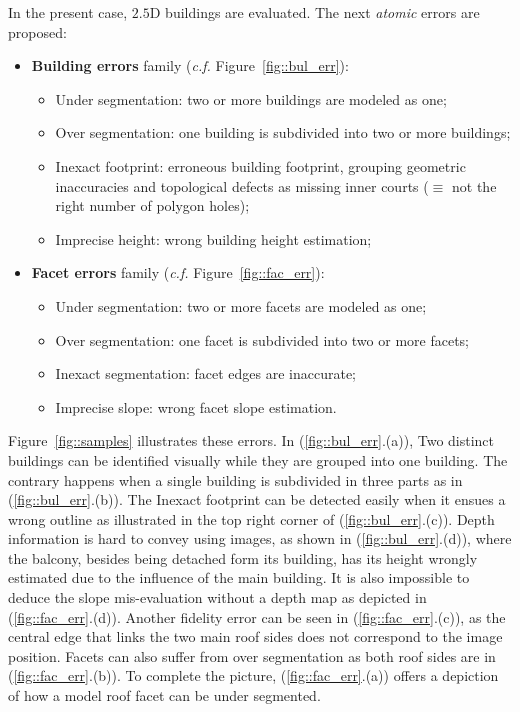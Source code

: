 \documentclass[runningheads]{llncs}
\begin{document}
In the present case, $2.5$D buildings are evaluated. The next \textit{atomic} errors are proposed:
	\begin{itemize}
		\item \textbf{Building errors} family (\textit{c.f.} Figure~\ref{fig::bul_err}):
        \begin{itemize}
        	\item Under segmentation: two or more buildings are modeled as one;
            \item Over segmentation: one building is subdivided into two or more buildings;
            \item Inexact footprint: erroneous building footprint, grouping geometric inaccuracies and topological defects as missing inner courts ($\equiv$ not the right number of polygon holes);
            \item Imprecise height: wrong building height estimation;
        \end{itemize}
		\item \textbf{Facet errors} family (\textit{c.f.} Figure~\ref{fig::fac_err}):
        \begin{itemize}
        	\item Under segmentation: two or more facets are modeled as one;
            \item Over segmentation: one facet is subdivided into two or more facets;
            \item Inexact segmentation: facet edges are inaccurate;
            \item Imprecise slope: wrong facet slope estimation.
        \end{itemize}
	\end{itemize}

Figure~\ref{fig::samples} illustrates these errors. In (\ref{fig::bul_err}.(a)), Two distinct buildings can be identified visually while they are grouped into one building. The contrary happens when a single building is subdivided in three parts as in (\ref{fig::bul_err}.(b)). The Inexact footprint can be detected easily when it ensues a wrong outline as illustrated in the top right corner of (\ref{fig::bul_err}.(c)). Depth information is hard to convey using images, as shown in (\ref{fig::bul_err}.(d)), where the balcony, besides being detached form its building, has its height wrongly estimated due to the influence of the main building. It is also impossible to deduce the slope mis-evaluation without a depth map as depicted in (\ref{fig::fac_err}.(d)). Another fidelity error can be seen in (\ref{fig::fac_err}.(c)), as the central edge that links the two main roof sides does not correspond to the image position. Facets can also suffer from over segmentation as both roof sides are in (\ref{fig::fac_err}.(b)). To complete the picture, (\ref{fig::fac_err}.(a)) offers a depiction of how a model roof facet can be under segmented.
\end{document}

